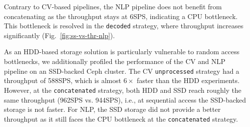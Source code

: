 {Contrary to CV-based pipelines, the NLP pipeline does not benefit from concatenating as the throughput stays at 6\:SPS, indicating a CPU bottleneck.
This bottleneck is resolved in the \texttt{decoded} strategy, where throughput increases significantly (Fig.~\ref{fig:ss-vs-thr-nlp}).

As an HDD-based storage solution is particularly vulnerable to random access bottlenecks, we additionally profiled the performance of the CV and NLP pipeline on an SSD-backed Ceph cluster.
The CV \texttt{unprocessed} strategy had a throughput of 588\:SPS, which is almost $6\times$ faster than the HDD experiments.
However, at the \texttt{concatenated} strategy, both HDD and SSD reach roughly the same throughput (962\:SPS vs. 944\:SPS), i.e., at sequential access the SSD-backed storage is not faster.
For NLP, the SSD storage did not provide a better throughput as it still faces the CPU bottleneck at the \texttt{concatenated} strategy.

}
